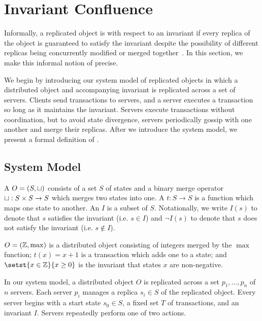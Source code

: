 \section{Invariant Confluence}
Informally, a replicated object is  with respect
to an invariant if every replica of the object is guaranteed to satisfy the
invariant despite the possibility of different replicas being concurrently
modified or merged together~\cite{bailis2014coordination}. In this section, we
make this informal notion of \invariantconfluence{} precise.

We begin by introducing our system model of replicated objects in which a
distributed object and accompanying invariant is replicated across a set of
servers. Clients send transactions to servers, and a server executes a
transaction so long as it maintains the invariant. Servers execute
transactions without coordination, but to avoid state divergence, servers
periodically gossip with one another and merge their replicas.
%
After we introduce the system model, we present a formal definition of
\invariantconfluence{}.

\subsection{System Model}

A  $O = (S, \sqcup)$ consists of a set $S$ of states
and a binary merge operator $\sqcup: S \times S \to S$ which merges two states
into one. A  $t: S \to S$ is a function which maps one
state to another. An  $I$ is a subset of $S$.  Notationally,
we write $I(s)$ to denote that $s$ satisfies the invariant (i.e.  $s \in I$)
and $\lnot I(s)$ to denote that $s$ does not satisfy the invariant (i.e. $s
\notin I$).

\begin{example}
  $O = (\mathbb{Z}, \max)$ is a distributed object consisting of integers merged by the
  $\max$ function; $t(x) = x + 1$ is a transaction which adds one to a state; and
  $\setst{x \in \ints}{x \geq 0}$ is the invariant that states $x$ are
  non-negative.
\end{example}

In our system model, a distributed object $O$ is replicated across a set $p_1,
\ldots, p_n$ of $n$ servers. Each server $p_i$ manages a replica $s_i \in S$ of
the replicated object. Every server begins with a start state $s_0 \in S$, a
fixed set $T$ of transactions, and an invariant $I$. Servers repeatedly perform
one of two actions.

